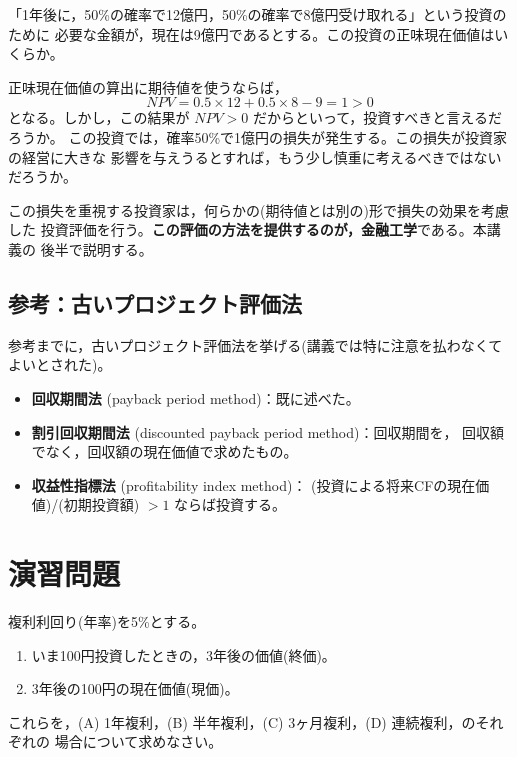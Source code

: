 \begin{example}[将来キャッシュフローが不確実な場合]
「1年後に，50\%の確率で12億円，50\%の確率で8億円受け取れる」という投資のために
必要な金額が，現在は9億円であるとする。この投資の正味現在価値はいくらか。

正味現在価値の算出に期待値を使うならば，
\[
NPV = 0.5\times 12 + 0.5\times 8 - 9 = 1 > 0
\]
となる。しかし，この結果が $NPV>0$ だからといって，投資すべきと言えるだろうか。
この投資では，確率50\%で1億円の損失が発生する。この損失が投資家の経営に大きな
影響を与えうるとすれば，もう少し慎重に考えるべきではないだろうか。
\end{example}

この損失を重視する投資家は，何らかの(期待値とは別の)形で損失の効果を考慮した
投資評価を行う。\textbf{この評価の方法を提供するのが，金融工学}である。本講義の
後半で説明する。

\subsection*{参考：古いプロジェクト評価法}

参考までに，古いプロジェクト評価法を挙げる(講義では特に注意を払わなくて
よいとされた)。
\begin{itemize}
\item \textbf{回収期間法} (payback period method)：既に述べた。
\item \textbf{割引回収期間法} (discounted payback period method)：回収期間を，
回収額でなく，回収額の現在価値で求めたもの。
\item \textbf{収益性指標法} (profitability index method)：
(投資による将来CFの現在価値)/(初期投資額) $> 1$ ならば投資する。
\end{itemize}

\section{演習問題}

\begin{exercise}[問題2-1]
複利利回り(年率)を5\%とする。
\begin{enumerate}
\item[(1)] いま100円投資したときの，3年後の価値(終価)。
\item[(2)] 3年後の100円の現在価値(現価)。
\end{enumerate}
これらを，(A) 1年複利，(B) 半年複利，(C) 3ヶ月複利，(D) 連続複利，のそれぞれの
場合について求めなさい。
\end{exercise}

